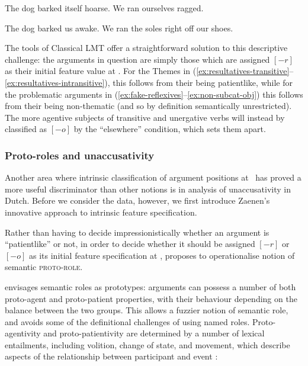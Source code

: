 \documentclass[output=paper]{langscibook}
\begin{document}
\ea\label{ex:fake-reflexives}
\ea The dog barked itself hoarse.
\ex We ran ourselves ragged.
\z

\newpage
\ex\label{ex:non-subcat-obj}
\ea The dog barked us awake.
\ex We ran the soles right off our shoes.
\z
\z

The tools of Classical LMT offer a straightforward solution to this descriptive
challenge: the arguments in question are simply those which are assigned $[-r]$
as their initial feature value at \astruc. For the Themes in
(\ref{ex:resultatives-transitive}--\ref{ex:resultatives-intransitive}), this
follows from their being patientlike, while for the problematic arguments in
(\ref{ex:fake-reflexives}--\ref{ex:non-subcat-obj}) this follows from their
being non-thematic (and so by definition semantically unrestricted). The more
agentive subjects of transitive and unergative verbs will instead by classified
as $[-o]$ by the ``elsewhere'' condition, which sets them apart.


\subsubsection{Proto-roles and unaccusativity}\label{sec:argstr:unaccusativity}

Another area where intrinsic classification of argument positions at \astruc\
has proved a more useful discriminator than other notions is in
 analysis of unaccusativity in Dutch. Before we consider the
data, however, we first introduce Zaenen's innovative approach to intrinsic
feature specification.

Rather than having to decide impressionistically whether an argument is
``patientlike'' or not, in order to decide whether it should be assigned $[-r]$
or $[-o]$ as its initial feature specification at \astruc,
\citet[146--154]{zaenen93} proposes to operationalise  notion
of semantic \textsc{proto-role}.

\citet[571--575]{Dowty1991} envisages semantic roles as prototypes: arguments can
possess a number of both proto-agent and proto-patient properties, with their
behaviour depending on the balance between the two groups. This allows a fuzzier
notion of semantic role, and avoids some of the definitional challenges of using
named roles. Proto-agentivity and proto-patientivity are determined by a number
of lexical entailments, including volition, change of state, and movement, which
describe aspects of the relationship between participant and event
\citep[572]{Dowty1991}:
\end{document}
